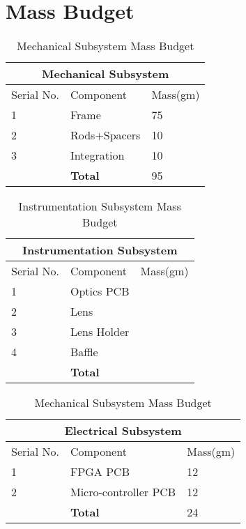 \documentclass[../../main.tex]{subfiles}
\begin{document}
\section{Mass Budget}
    \begin{table}[H]
        \centering
        \begin{tabular}{|p{2.5cm}|p{4cm}|p{2.5cm}|}
             \hline
             \multicolumn{3}{|c|}{\textbf{Mechanical Subsystem}} \\
             \hline
             Serial No.& Component & Mass(gm)  \\
             \hline
              1 & Frame & 75\\
             \hline
             2 & Rods+Spacers & 10 \\
             \hline
             3 & Integration & 10 \\
             \hline
              & \textbf{Total} & 95 \\
             \hline
        \end{tabular}
        \caption{Mechanical Subsystem Mass Budget}
        \label{tab:my_label}
    \end{table}
    
    \begin{table}[H]
        \centering
        \begin{tabular}{|p{2.5cm}|p{4cm}|p{2.5cm}|}
             \hline
             \multicolumn{3}{|c|}{\textbf{Instrumentation Subsystem}} \\
             \hline
             Serial No.& Component & Mass(gm)  \\
             \hline
             1 & Optics PCB & \\
             \hline
             2 & Lens & \\
             \hline
             3 & Lens Holder &\\
             \hline
             4 & Baffle &\\
             \hline
             & \textbf{Total} & \\
             \hline
        \end{tabular}
        \caption{Instrumentation Subsystem Mass Budget}
        \label{tab:my_label}
    \end{table}
    \begin{table}[H]
        \centering
        \begin{tabular}{|p{2.5cm}|p{4cm}|p{2.5cm}|}
             \hline
             \multicolumn{3}{|c|}{\textbf{Electrical Subsystem}} \\
             \hline
             Serial No.& Component & Mass(gm)  \\
             \hline
             1 & FPGA PCB & 12\\
             \hline
             2 & Micro-controller PCB & 12\\
             \hline
             & \textbf{Total} & 24\\
             \hline
        \end{tabular}
        \caption{Mechanical Subsystem Mass Budget}
        \label{tab:my_label}
    \end{table}

\end{document}
